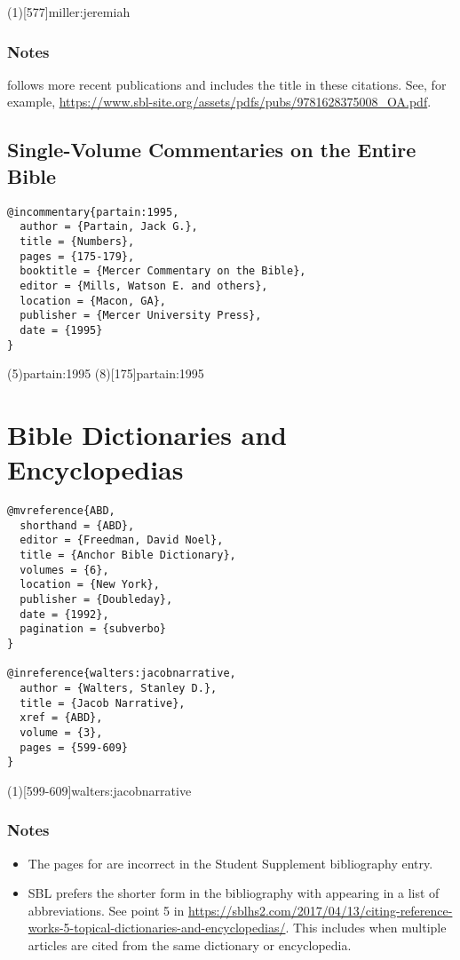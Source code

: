 \documentclass[a4paper]{article}
\begin{document}
\examplecite(1)[577]{miller:jeremiah}
\exampleabbreviations
\examplebibliography

\subsubsection{Notes}

 follows more recent publications and includes the title in
these citations. See, for example,
\url{https://www.sbl-site.org/assets/pdfs/pubs/9781628375008_OA.pdf}.

\subsection{Single-Volume Commentaries on the Entire Bible}

\begin{verbatim}
@incommentary{partain:1995,
  author = {Partain, Jack G.},
  title = {Numbers},
  pages = {175-179},
  booktitle = {Mercer Commentary on the Bible},
  editor = {Mills, Watson E. and others},
  location = {Macon, GA},
  publisher = {Mercer University Press},
  date = {1995}
}
\end{verbatim}

\examplecite(5){partain:1995}
\examplecite(8)[175]{partain:1995}
\examplebibliography

\section{Bible Dictionaries and Encyclopedias}

\begin{verbatim}
@mvreference{ABD,
  shorthand = {ABD},
  editor = {Freedman, David Noel},
  title = {Anchor Bible Dictionary},
  volumes = {6},
  location = {New York},
  publisher = {Doubleday},
  date = {1992},
  pagination = {subverbo}
}

@inreference{walters:jacobnarrative,
  author = {Walters, Stanley D.},
  title = {Jacob Narrative},
  xref = {ABD},
  volume = {3},
  pages = {599-609}
}
\end{verbatim}

\examplecite(1)[599-609]{walters:jacobnarrative}
\exampleabbreviations
\examplebibliography

\subsubsection{Notes}

\begin{itemize}
  \item The pages for \cite{walters:jacobnarrative} are incorrect in the
    Student Supplement bibliography entry.
  \item SBL prefers the shorter form in the bibliography with \cite{ABD}
    appearing in a list of abbreviations. See point 5 in
    \url{https://sblhs2.com/2017/04/13/citing-reference-works-5-topical-dictionaries-and-encyclopedias/}.
    This includes when multiple articles are cited from the same dictionary or
    encyclopedia.
\end{itemize}
\end{document}
